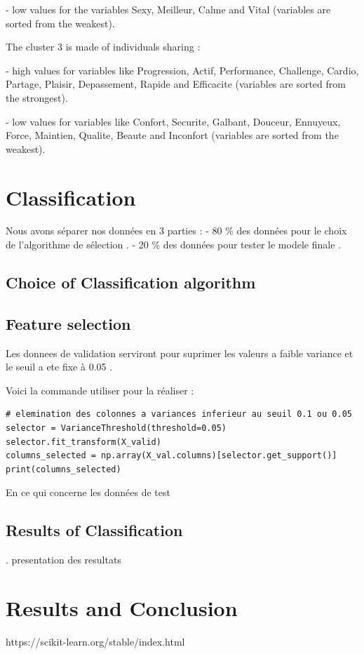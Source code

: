 \documentclass[12pt]{article}
\begin{document}
-	low values for the variables Sexy, Meilleur, Calme and Vital (variables are sorted from the weakest).


The cluster 3 is made of individuals sharing :


-	high values for variables like Progression, Actif, Performance, Challenge, Cardio, Partage, Plaisir, Depassement, Rapide and Efficacite (variables are sorted from the strongest).

-	low values for variables like Confort, Securite, Galbant, Douceur, Ennuyeux, Force, Maintien, Qualite, Beaute and Inconfort (variables are sorted from the weakest).


\newpage


\section{Classification}  %
 
 Nous avons séparer nos données en 3 parties :
- 80 \% des données pour le choix de l'algorithme de sélection .
- 20 \% des données pour tester le modele finale .

\subsection{Choice of Classification algorithm} 


\subsection{Feature selection} 



\setlength{\parindent}{0pt} Les donnees de validation serviront pour suprimer les valeurs a faible variance et  le seuil a ete fixe à 0.05 .

\setlength{\parindent}{0pt} Voici la commande utiliser pour la réaliser : 

\begin{lstlisting}
# elemination des colonnes a variances inferieur au seuil 0.1 ou 0.05
selector = VarianceThreshold(threshold=0.05)
selector.fit_transform(X_valid)
columns_selected = np.array(X_val.columns)[selector.get_support()] 
print(columns_selected)
\end{lstlisting}
En ce qui concerne les données de test 



\subsection{Results of Classification} 
. presentation des resultats


\section{Results and Conclusion}


\begin{thebibliography}{9}


https://scikit-learn.org/stable/index.html




\end{thebibliography}
\end{document}
